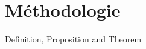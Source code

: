 \section{Méthodologie}

\begin{frame}{Definition, Proposition and Theorem}

\begin{definition}
\lipsum[3][1-4]
\end{definition}

\begin{proposition}\label{prop:1}
\lipsum[3][5-8]
\end{proposition}

\begin{theorem}\label{theorem:generalization bound}
\lipsum[3][9-12]
\end{theorem}
    
\end{frame}
